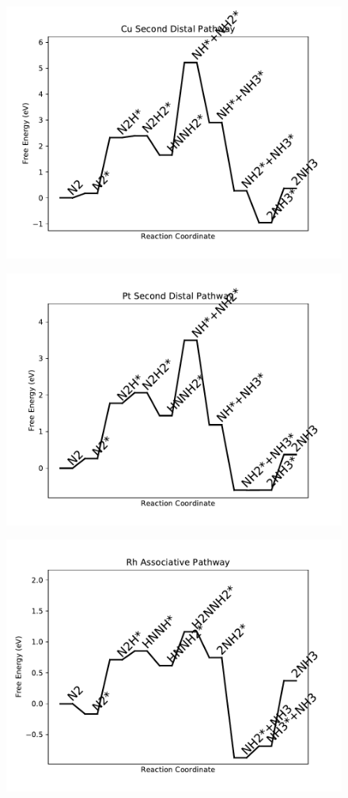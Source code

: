 \begin{figure}
\centering
\includegraphics[width=0.8\linewidth]{data/plots/Cu_distal_2.pdf}
\end{figure}

\begin{figure}
\centering
\includegraphics[width=0.8\linewidth]{data/plots/Pt_distal_2.pdf}
\end{figure}

\begin{figure}
\centering
\includegraphics[width=0.8\linewidth]{data/plots/Rh_associative.pdf}
\end{figure}

